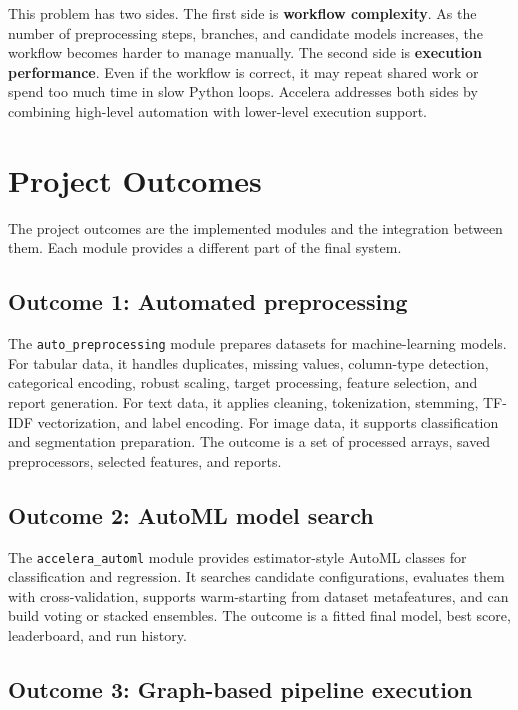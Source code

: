 \documentclass[12pt,a4paper]{report}
\begin{document}
This problem has two sides. The first side is \textbf{workflow complexity}. As
the number of preprocessing steps, branches, and candidate models increases, the
workflow becomes harder to manage manually. The second side is
\textbf{execution performance}. Even if the workflow is correct, it may repeat
shared work or spend too much time in slow Python loops. Accelera addresses both
sides by combining high-level automation with lower-level execution support.

\section{Project Outcomes}

The project outcomes are the implemented modules and the integration between
them. Each module provides a different part of the final system.

\subsection*{Outcome 1: Automated preprocessing}

The \texttt{auto\_preprocessing} module prepares datasets for machine-learning
models. For tabular data, it handles duplicates, missing values, column-type
detection, categorical encoding, robust scaling, target processing, feature
selection, and report generation. For text data, it applies cleaning,
tokenization, stemming, TF-IDF vectorization, and label encoding. For image
data, it supports classification and segmentation preparation. The outcome is a
set of processed arrays, saved preprocessors, selected features, and reports.

\subsection*{Outcome 2: AutoML model search}

The \texttt{accelera\_automl} module provides estimator-style AutoML classes for
classification and regression. It searches candidate configurations, evaluates
them with cross-validation, supports warm-starting from dataset metafeatures,
and can build voting or stacked ensembles. The outcome is a fitted final model,
best score, leaderboard, and run history.

\subsection*{Outcome 3: Graph-based pipeline execution}
\end{document}
